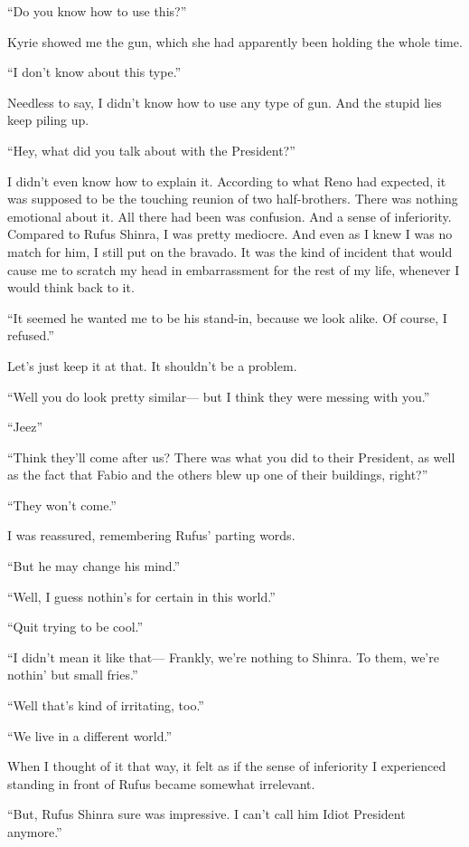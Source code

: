 \documentclass[oneside]{book}
\begin{document}
“Do you know how to use this?”

Kyrie showed me the gun, which she had apparently been holding the whole time.

“I don’t know about this type.”

Needless to say, I didn’t know how to use any type of gun. And the stupid lies keep piling up.

“Hey, what did you talk about with the President?”

I didn’t even know how to explain it. According to what Reno had expected, it was supposed to be the touching reunion of two half-brothers. There was nothing emotional about it. All there had been was confusion. And a sense of inferiority. Compared to Rufus Shinra, I was pretty mediocre. And even as I knew I was no match for him, I still put on the bravado. It was the kind of incident that would cause me to scratch my head in embarrassment for the rest of my life, whenever I would think back to it.

“It seemed he wanted me to be his stand-in, because we look alike. Of course, I refused.”

Let’s just keep it at that. It shouldn’t be a problem.

“Well you do look pretty similar— but I think they were messing with you.”

“Jeez”

“Think they’ll come after us? There was what you did to their President, as well as the fact that Fabio and the others blew up one of their buildings, right?”

“They won’t come.”

I was reassured, remembering Rufus’ parting words.

“But he may change his mind.”

“Well, I guess nothin’s for certain in this world.”

“Quit trying to be cool.”

“I didn’t mean it like that— Frankly, we’re nothing to Shinra. To them, we’re nothin’ but small fries.”

“Well that’s kind of irritating, too.”

“We live in a different world.”

When I thought of it that way, it felt as if the sense of inferiority I experienced standing in front of Rufus became somewhat irrelevant.

“But, Rufus Shinra sure was impressive. I can’t call him Idiot President anymore.”
\end{document}
